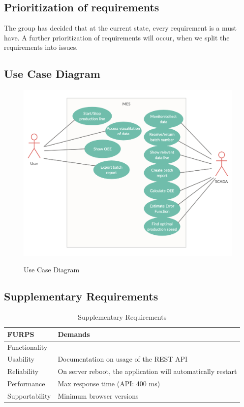 \subsection{Prioritization of requirements}
The group has decided that at the current state, every requirement is a must have.
A further prioritization of requirements will occur, when we split the requirements into issues.

\subsection{Use Case Diagram}
\begin{figure}[H]
\centering 
\includegraphics[scale=0.5]{images/ucdiagram.png}
\label{figure:Use_Case_Diagram}
\caption{Use Case Diagram} 
\end{figure}

\subsection{Supplementary Requirements}
\begin{table}[ht]
    \begin{tabularx}{\textwidth}{|>{\RaggedRight}p{4cm}|>{\RaggedRight}X|}
        \hline
        \textbf{FURPS}          	& \textbf{Demands} \\
        \hline
        Functionality  	&  \\
        \hline
        Usability      	& Documentation on usage of the REST API \\
        \hline
        Reliability    	& On server reboot, the application will automatically restart \\
        \hline
        Performance    	& Max response time (API: 400 ms) \\
        \hline
        Supportability 	& Minimum browser versions \\
        \hline
    \end{tabularx}
    \caption{Supplementary Requirements} 
    \label{table:sup_requirements}
\end{table} 

